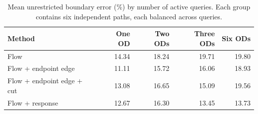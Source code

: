 \begin{table}[t]\centering\small
\caption{Mean unrestricted boundary error (\%) by number of active queries. Each group contains six independent paths, each balanced across queries.}
\label{tab:pair-groups-v102}
\begin{tabular}{lrrrr}\toprule Method & One OD & Two ODs & Three ODs & Six ODs\\\midrule
Flow & 14.34 & 18.24 & 19.71 & 19.80\\
Flow + endpoint edge & 11.11 & 15.72 & 16.06 & 18.93\\
Flow + endpoint edge + cut & 13.08 & 16.65 & 15.09 & 19.56\\
Flow + response & 12.67 & 16.30 & 13.45 & 13.73\\
\bottomrule\end{tabular}\end{table}
